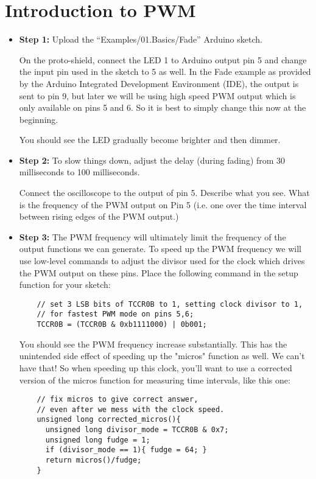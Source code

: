 \documentclass[12pt]{article}
\begin{document}
\section{Introduction to PWM}
\begin{itemize}
\item {\bf Step 1:} Upload the ``Examples/01.Basics/Fade'' Arduino sketch.

On the proto-shield, connect the LED 1 to Arduino output pin 5 and change the input pin used in the sketch to 5 as well.  In the Fade example as provided by the Arduino Integrated Development Environment (IDE), 
the output is sent to pin 9, but later we will be using high speed PWM output which is
only available on pins 5 and 6.  So it is best to simply change this now at the beginning.

You should see the LED gradually become brighter and then dimmer.

\item {\bf Step 2:} To slow things down, adjust the delay (during fading) from 30
milliseconds to 100 milliseconds.  

Connect the oscilloscope to the output of pin 5.  Describe what you see.  What is the frequency of the PWM output on Pin 5 (i.e. one over the time interval between rising edges of the PWM output.)

\item {\bf Step 3:} The PWM frequency will ultimately limit the frequency of the output functions we can generate.  To speed up the PWM frequency we will use low-level commands to adjust the divisor used for the clock which drives the PWM output on these pins.  Place the following command in the setup function for your sketch:
\begin{verbatim}
    // set 3 LSB bits of TCCR0B to 1, setting clock divisor to 1,
    // for fastest PWM mode on pins 5,6;
    TCCR0B = (TCCR0B & 0xb1111000) | 0b001;
\end{verbatim}
You should see the PWM frequency increase substantially.  This has the unintended side effect of speeding up the "micros" function as well.  We can't have that!  So when speeding up this clock, you'll want to use a corrected version of the micros function for measuring time intervals, like this one:

\begin{verbatim}
    // fix micros to give correct answer,
    // even after we mess with the clock speed.
    unsigned long corrected_micros(){
      unsigned long divisor_mode = TCCR0B & 0x7;
      unsigned long fudge = 1;
      if (divisor_mode == 1){ fudge = 64; }  
      return micros()/fudge;
    }
\end{verbatim}

\end{itemize}
\end{document}
